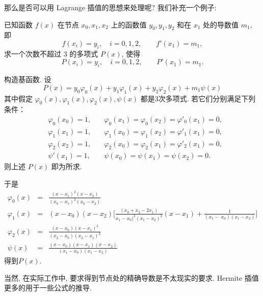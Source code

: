 \documentclass[a4paper]{ctexart}
\numberwithin{theorem}{section}
\numberwithin{equation}{section}
\numberwithin{figure}{section}
\numberwithin{remark}{section}
\begin{document}
那么是否可以用 Lagrange 插值的思想来处理呢? 我们补充一个例子:

已知函数 $f(x)$ 在节点 $x_0, x_1, x_2$ 上的函数值 $y_0, y_1, y_2$ 和在 $x_1$ 处的导数值
$m_1$, 即                                                                           
$$
f(x_i) = y_i,\quad i = 0, 1, 2, \qquad f'(x_1) = m_1,
$$                                 
求一个次数不超过 $3$ 的多项式 $P(x)$, 使得                                            
$$
P(x_i) = y_i,\quad i = 0, 1, 2, \qquad P'(x_1) = m_1.
$$  

构造基函数. 设                                                                   
$$
P(x) = y_0 \varphi_0(x) + y_1 \varphi_1(x) + y_2 \varphi_2(x) + m_1 \psi(x)
$$                                 
其中假定 $\varphi_0(x), \varphi_1(x), \varphi_2(x), \psi(x)$ 都是3次多项式.
若它们分别满足下列条件：     
\begin{eqnarray}                                                                                    
&\varphi_0(x_0)=1, \quad &\varphi_0(x_1)=\varphi_0(x_2)=\varphi'_0(x_1)=0,\\             
&\varphi_1(x_1)=1,\quad &\varphi_1(x_0)=\varphi_1(x_2)=\varphi'_1(x_1)=0,\\             
&\varphi_2(x_2)=1,\quad &\varphi_2(x_0)=\varphi_2(x_1)=\varphi'_2(x_1)=0,\\             
&\psi'(x_1)=1,\quad &\psi(x_0)=\psi(x_1)=\psi(x_2)=0.                                   
\end{eqnarray}                                                                                      
则上述 $P(x)$ 即为所求.

于是                                                                                     
\begin{eqnarray*}                                                                                            
\varphi_0(x)&=&\frac{(x-x_1)^2(x-x_2)}{(x_0-x_1)^2(x_0-x_2)}\\                                       
\varphi_1(x)&=&(x-x_0)(x-x_2)\Big[\frac{(x_0+x_2-2x_1)}{x_1-x_0)^2(x_1-x_2)^2}(x-x_1)+\frac{1}{(x_1-\
x_0)(x_1-x_2)}\Big]\\                                                                               
\varphi_2(x)&=&\frac{(x-x_0)(x-x_1)^2}{(x_2-x_0)(x_2-x_1)^2}\\                                       
\psi(x)&=&\frac{(x-x_0)(x-x_1)(x-x_2)}{(x_1-x_0)(x_1-x_2)}                                           
\end{eqnarray*}                                                                                                  
得到$P(x)$.

当然, 在实际工作中, 要求得到节点处的精确导数是不太现实的要求. Hermite 插值
更多的用于一些公式的推导.






\end{document}
